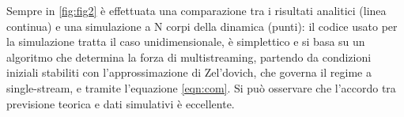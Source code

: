 Sempre in \ref{fig:fig2} è effettuata una comparazione tra i risultati analitici (linea continua) e una simulazione 
a N corpi della dinamica (punti): il codice usato per la simulazione tratta il caso unidimensionale, è simplettico
e si basa su un algoritmo che determina la forza di multistreaming, partendo da condizioni iniziali stabiliti con
l'approssimazione di Zel'dovich, che governa il regime a single-stream, e tramite l'equazione \ref{eqn:com}.
Si può osservare che l'accordo tra previsione teorica e dati simulativi è eccellente.